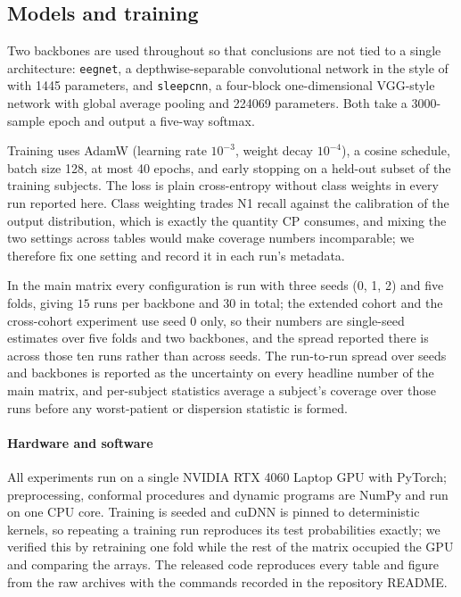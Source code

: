 \subsection{Models and training}
\label{sec:models}

Two backbones are used throughout so that conclusions are not tied to a
single architecture: \texttt{eegnet}, a depthwise-separable convolutional
network in the style of \citet{lawhern2018} with \num{1445} parameters, and
\texttt{sleepcnn}, a four-block one-dimensional VGG-style network with global
average pooling and \num{224069} parameters. Both take a
$3000$-sample epoch and output a five-way softmax.

Training uses AdamW (learning rate $10^{-3}$, weight decay $10^{-4}$), a
cosine schedule, batch size 128, at most 40 epochs, and early stopping on a
held-out subset of the training subjects. The loss is plain cross-entropy
without class weights in every run reported here. Class weighting trades N1
recall against the calibration of the output distribution, which is exactly
the quantity CP consumes, and mixing the two settings across tables would
make coverage numbers incomparable; we therefore fix one setting and record
it in each run's metadata.

In the main matrix every configuration is run with three seeds (0, 1, 2) and
five folds, giving $15$ runs per backbone and $30$ in total; the extended
cohort and the cross-cohort experiment use seed 0 only, so their numbers are
single-seed estimates over five folds and two backbones, and the spread
reported there is across those ten runs rather than across seeds. The
run-to-run spread over seeds and backbones is
reported as the uncertainty on every headline number of the main matrix, and
per-subject statistics average a subject's coverage over those runs before
any worst-patient or dispersion statistic is formed.

\paragraph{Hardware and software}
All experiments run on a single NVIDIA RTX 4060 Laptop GPU with PyTorch;
preprocessing, conformal procedures and dynamic programs are NumPy and run on
one CPU core. Training is seeded and cuDNN is pinned to deterministic kernels,
so repeating a training run reproduces its test probabilities exactly; we
verified this by retraining one fold while the rest of the matrix occupied the
GPU and comparing the arrays. The released code reproduces every table and
figure from the raw archives with the commands recorded in the repository
README.

